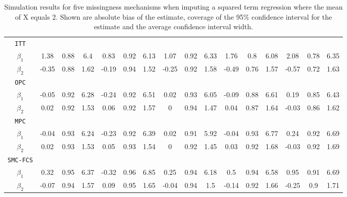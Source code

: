 \begin{table}[ht!]
{\begin{tabular}{c|ccc|ccc|ccc|ccc|ccc}
				\texttt{ITT}            &        &        &        &        &        &        &        &        &        &        &        &        &        &        &        \\
				$\beta_1$      & 1.38  & 0.88  & 6.4  & 0.83  & 0.92  & 6.13  & 1.07  & 0.92   & 6.33  & 1.76  & 0.8  & 6.08  & 2.08  & 0.78  & 6.35  \\
				$\beta_2$      & -0.35  & 0.88  & 1.62  & -0.19  & 0.94  & 1.52  & -0.25  & 0.92  & 1.58  & -0.49  & 0.76  & 1.57  & -0.57  & 0.72  & 1.63  \\	
				\texttt{OPC}     &         &        &        &         &        &        &         &        &        &         &        &        &         &        &        \\
				$\beta_1$                         & -0.05  & 0.92  & 6.28  & -0.24   & 0.92  & 6.51  & 0.02   & 0.93  & 6.05  & -0.09   & 0.88  & 6.61  & 0.19    & 0.85  & 6.43  \\
				$\beta_2$                         & 0.02    & 0.92   & 1.53  & 0.06   & 0.92  & 1.57  & 0   & 0.94  & 1.47   & 0.04   & 0.87  & 1.64  & -0.03   & 0.86  & 1.62  \\
				\texttt{MPC}     &         &        &        &         &        &        &         &        &        &         &        &        &         &        &        \\
				$\beta_1$                         & -0.04   & 0.93  & 6.24  & -0.23   & 0.92   & 6.39  & 0.02  & 0.91  & 5.92  & -0.04  & 0.93  & 6.77  & 0.24   & 0.92  & 6.69   \\
				$\beta_2$                         & 0.02   & 0.93  & 1.53  & 0.05    & 0.93  & 1.54  & 0   & 0.92   & 1.45  & 0.03   & 0.92   & 1.68  & -0.03   & 0.92   & 1.69  \\
				\texttt{SMC-FCS} &         &        &        &         &        &        &         &        &        &         &        &        &         &        &        \\
				$\beta_1$                         & 0.32   & 0.95  & 6.37  &-0.32   & 0.96  & 6.85   & 0.25   & 0.94  & 6.18  & 0.5   & 0.94  & 6.58  & 0.95   & 0.91  & 6.69  \\
				$\beta_2$                         & -0.07   & 0.94  & 1.57  & 0.09   & 0.95   & 1.65  & -0.04   & 0.94  & 1.5  & -0.14   & 0.92   & 1.66  & -0.25   & 0.9  & 1.71 
			\end{tabular}
		}
		\caption{Simulation results for five missingness mechanisms when imputing a squared term regression where the mean of X equals 2. Shown are absolute bias of the estimate, coverage of the 95\% confidence interval for the estimate and the average confidence interval width.}
		\label{tab2_4}
	\end{table}


